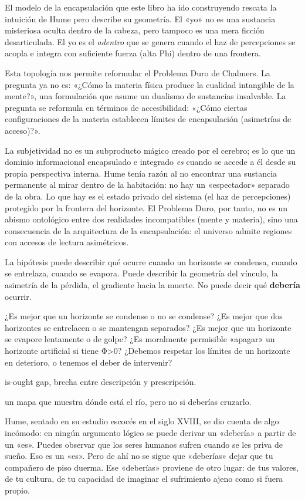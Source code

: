 El modelo de la encapsulación que este libro ha ido construyendo rescata la intuición de Hume pero describe su geometría. El «yo» no es una sustancia misteriosa oculta dentro de la cabeza, pero tampoco es una mera ficción desarticulada. El yo es el \emph{adentro} que se genera cuando el haz de percepciones se acopla e integra con suficiente fuerza (alta Phi) dentro de una frontera.

Esta topología nos permite reformular el Problema Duro de Chalmers. La pregunta ya no es: «¿Cómo la materia física produce la cualidad intangible de la mente?», una formulación que asume un dualismo de sustancias insalvable. La pregunta se reformula en términos de accesibilidad: «¿Cómo ciertas configuraciones de la materia establecen límites de encapsulación (asimetrías de acceso)?».

La subjetividad no es un subproducto mágico creado por el cerebro; es lo que un dominio informacional encapsulado e integrado \emph{es} cuando se accede a él desde su propia perspectiva interna. Hume tenía razón al no encontrar una sustancia permanente al mirar dentro de la habitación: no hay un «espectador» separado de la obra. Lo que hay es el estado privado del sistema (el haz de percepciones) protegido por la frontera del horizonte. El Problema Duro, por tanto, no es un abismo ontológico entre dos realidades incompatibles (mente y materia), sino una consecuencia de la arquitectura de la encapsulación: el universo admite regiones con accesos de lectura asimétricos.

\noindent La hipótesis puede describir qué ocurre cuando un horizonte se condensa, cuando se entrelaza, cuando se evapora. Puede describir la geometría del vínculo, la asimetría de la pérdida, el gradiente hacia la muerte. No puede decir qué \textbf{debería} ocurrir.

¿Es mejor que un horizonte se condense o no se condense? ¿Es mejor que dos horizontes se entrelacen o se mantengan separados? ¿Es mejor que un horizonte se evapore lentamente o de golpe? ¿Es moralmente permisible «apagar» un horizonte artificial si tiene Φ>0? ¿Debemos respetar los límites de un horizonte en deterioro, o tenemos el deber de intervenir?

\begin{fisica}
 is-ought gap, brecha entre descripción y prescripción.

 un mapa que muestra dónde está el río, pero no si deberías cruzarlo.
\end{fisica}
Hume, sentado en su estudio escocés en el siglo XVIII, se dio cuenta de algo incómodo: en ningún argumento lógico se puede derivar un «debería» a partir de un «es». Puedes observar que los seres humanos sufren cuando se les priva de sueño. Eso es un «es». Pero de ahí no se sigue que «deberías» dejar que tu compañero de piso duerma. Ese «deberías» proviene de otro lugar: de tus valores, de tu cultura, de tu capacidad de imaginar el sufrimiento ajeno como si fuera propio.


